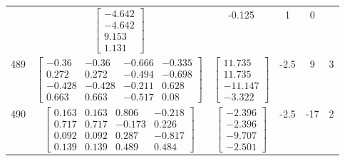 \documentclass[a4paper,12pt]{article}
\begin{document}
\begin{tabular}{c c c c c c}
&
$\begin{bmatrix} -4.642 \\ -4.642 \\ 9.153 \\ 1.131 \end{bmatrix}$
&
-0.125
&
1
&
0
\\
489
&
$\begin{bmatrix} -0.36 & -0.36 & -0.666 & -0.335 \\ 0.272 & 0.272 & -0.494 & -0.698 \\ -0.428 & -0.428 & -0.211 & 0.628 \\ 0.663 & 0.663 & -0.517 & 0.08 \end{bmatrix}$
&
$\begin{bmatrix} 11.735 \\ 11.735 \\ -11.147 \\ -3.322 \end{bmatrix}$
&
-2.5
&
9
&
3
\\
490
&
$\begin{bmatrix} 0.163 & 0.163 & 0.806 & -0.218 \\ 0.717 & 0.717 & -0.173 & 0.226 \\ 0.092 & 0.092 & 0.287 & -0.817 \\ 0.139 & 0.139 & 0.489 & 0.484 \end{bmatrix}$
&
$\begin{bmatrix} -2.396 \\ -2.396 \\ -9.707 \\ -2.501 \end{bmatrix}$
&
-2.5
&
-17
&
2
\\
\end{tabular} \egroup \newpage
\end{document}
